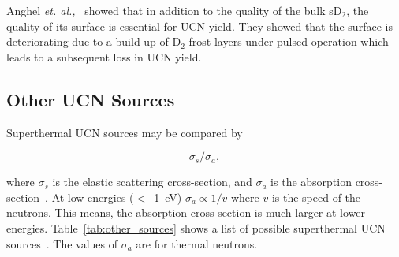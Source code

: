 Anghel {\it{et. al.,}}~\cite{anghel2018solid} showed that in addition
to the quality of the bulk sD$_2$, the quality of its surface is
essential for UCN yield. They showed that the surface is deteriorating
due to a build-up of D$_2$ frost-layers under pulsed operation which
leads to %
a subsequent loss in UCN yield.







\subsection{Other UCN Sources}
Superthermal UCN sources may be compared by

\begin{equation}
\sigma_s / \sigma_a,
\end{equation}

where $\sigma_s$ is the elastic scattering cross-section, and
$\sigma_a$ is the absorption
cross-section~\cite{Salvat2013,Atchison2009,Liu_thesis}. At low
energies ($<$~1~eV) $\sigma_a \propto 1/v$ where $v$ is the speed of
the neutrons. This means, the absorption cross-section is much larger
at lower energies.  Table~\ref{tab:other_sources} shows a list of
possible superthermal UCN sources~\cite{Liu_thesis}. The values of
$\sigma_a$ are for thermal neutrons.



